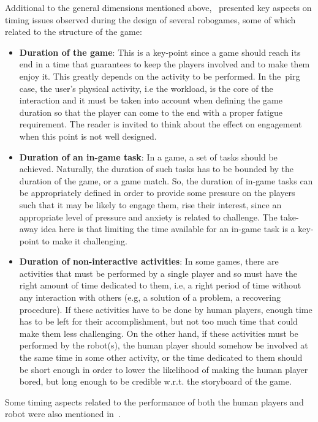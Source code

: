 Additional to the general dimensions mentioned above,~\cite{bonarini_timing_2014} presented key aspects on timing issues observed during the design of several robogames, some of which related to the structure of the game:

\begin{itemize}
\item \textbf{Duration of the game}: This is a key-point since a game should reach its end in a time that guarantees to keep the players involved and to make them enjoy it. This greatly depends on the activity to be performed. In the~\gls{pirg} case, the user's physical activity, i.e the workload, is the core of the interaction and it must be taken into account when defining the game duration so that the player can come to the end with a proper fatigue requirement. The reader is invited to think about the effect on engagement when this point is not well designed.

\item \textbf{Duration of an in-game task}: In a game, a set of tasks should be achieved. Naturally, the duration of such tasks has to be bounded by the duration of the game, or a game match. So, the duration of in-game tasks can be appropriately defined in order to provide some pressure on the players such that it may be likely to engage them, rise their interest, since an appropriate level of pressure and anxiety is related to challenge. The take-away idea here is that limiting the time available for an in-game task is a key-point to make it challenging.

\item \textbf{Duration of non-interactive activities}: In some games, there are activities that must be performed by a single player and so must have the right amount of time dedicated to them, i.e, a right period of time without any interaction with others (e.g, a solution of a problem, a recovering procedure). If these activities have to be done by human players, enough time has to be left for their accomplishment, but not too much time that could make them less challenging. On the other hand, if these activities must be performed by the robot(s), the human player should somehow be involved at the same time in some other activity, or the time dedicated to them should be short enough in order to lower the likelihood of making the human player bored, but long enough to be credible w.r.t. the storyboard of the game.
\end{itemize}

Some timing aspects related to the performance of both the human players and robot were also mentioned in~\cite{bonarini_timing_2014}.

